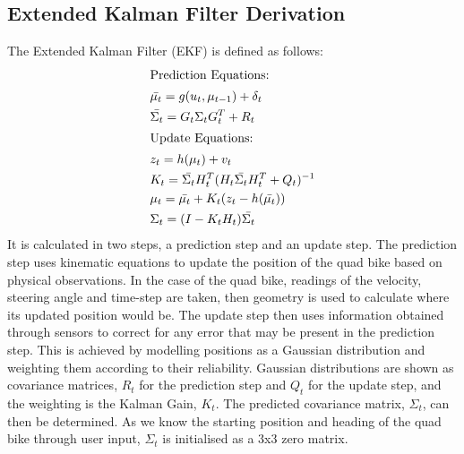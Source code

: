 \documentclass[main.tex]{subfiles}
\begin{document}
\begin{appendices}
\chapter{Extended Kalman Filter Derivation}
The Extended Kalman Filter (EKF) is defined as follows:
\begin{align}
\shortintertext{Prediction Equations:}
&\bar{\mu_t} = g(u_t, \mu_{t-1}) + \delta_t\\
&\bar{\Sigma_t} = G_t\Sigma_tG_t^T + R_t\\
\shortintertext{Update Equations:}
&z_t = h(\mu_t) + v_t\\
&K_t = \bar{\Sigma_t}H_t^T(H_t\bar{\Sigma_t}H_t^T + Q_t)^{-1}\\
&\mu_t = \bar{\mu_t} + K_t(z_t-h(\bar{\mu_t}))\\
&\Sigma_t = (I - K_tH_t)\bar{\Sigma_t}
\end{align}
It is calculated in two steps, a prediction step and an update step. The prediction step uses kinematic equations to update the position of the quad bike based on physical observations. In the case of the quad bike, readings of the velocity, steering angle and time-step are taken, then geometry is used to calculate where its updated position would be. The update step then uses information obtained through sensors to correct for any error that may be present in the prediction step. This is achieved by modelling positions as a Gaussian distribution and weighting them according to their reliability. Gaussian distributions are shown as covariance matrices, $R_t$ for the prediction step and $Q_t$ for the update step, and the weighting is the Kalman Gain, $K_t$. The predicted covariance matrix, $\Sigma_t$, can then be determined. As we know the starting position and heading of the quad bike through user input, $\Sigma_t$ is initialised as a 3x3 zero matrix.


\end{appendices}
\end{document}
